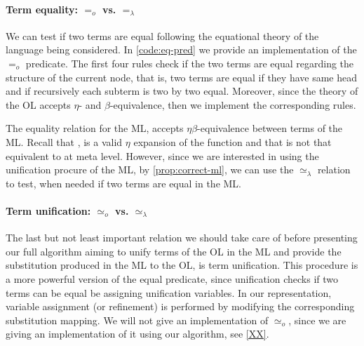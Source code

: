\documentclass[sigconf,natbib=false]{acmart}
\newcommand{\EqualRel}{\ensuremath{=}}
\newcommand{\UnifRel}{\ensuremath{\simeq}}
\newcommand{\Uo}{\ensuremath{\UnifRel_o}\xspace}
\newcommand{\Eo}{\ensuremath{\EqualRel_o}\xspace}
\newcommand{\Ue}{\ensuremath{\UnifRel_\lambda}\xspace}
\newcommand{\Ee}{\ensuremath{\EqualRel_\lambda}\xspace}
\begin{document}
\paragraph{Term equality: \Eo vs. \Ee} We can test if two terms are equal
following the equational theory of the language being considered. In
\cref{code:eq-pred} we provide an implementation of the \Eo predicate. The first
four rules check if the two terms are equal regarding the structure of the
current node, that is, two terms are equal if they have same head and if
recursively each subterm is two by two equal. Moreover, since the theory of the
OL accepts $\eta$- and $\beta$-equivalence, then we implement the corresponding
rules.

\noindent
The equality relation for the ML, accepts $\eta\beta$-equivalence between terms
of the ML. Recall that , is a valid $\eta$ expansion of the
function  and that  is not that equivalent to
 at meta level. However, since we are interested in using the
unification procure of the ML, by \cref{prop:correct-ml}, we can use the
\Ue relation to test, when needed if two terms are equal in the ML.

\paragraph{Term unification: \Uo vs. \Ue} 
The last but not least important relation we should take care of before
presenting our full algorithm aiming to unify terms of the OL in the ML and
provide the substitution produced in the ML to the OL, is term unification. This
procedure is a more powerful version of the equal predicate, since unification
checks if two terms can be equal be assigning unification variables. In our
representation, variable assignment (or refinement) is performed by modifying
the corresponding substitution mapping. We will not give an implementation of
\Uo, since we are giving an implementation of it using
our algorithm, see \cref{XX}.
\end{document}
